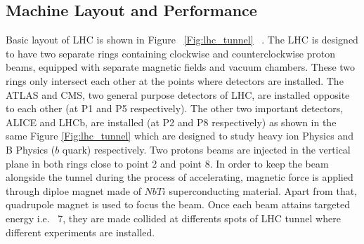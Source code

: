 \subsection{Machine Layout and Performance} \label{layout} 
Basic layout of LHC is shown in Figure ~\ref{Fig:lhc_tunnel} ~\cite{Reference28}. 
The LHC is designed to have two separate rings containing clockwise and counterclockwise proton beams, equipped with separate magnetic fields and vacuum chambers. These
two rings only intersect each other at the points where detectors are installed. The ATLAS and CMS, two general purpose detectors of LHC, are installed opposite to each other (at P1 and P5 respectively). The other two important detectors, ALICE and LHCb, are installed (at P2 and P8 respectively) as shown in the same Figure \ref{Fig:lhc_tunnel} which are designed to study heavy ion Physics and B Physics ($b$ quark) respectively. 
Two protons beams are  injected in the vertical plane in both rings close to point 2 and point 8. 
In order to keep the beam alongside the tunnel during the process of accelerating, magnetic force is applied through diploe magnet made of $NbTi$ superconducting material. Apart from that, quadrupole magnet is used to focus the beam. Once each beam attains targeted energy i.e. ~7\TeV, they are made collided at differents spots of LHC tunnel where different experiments are installed.

